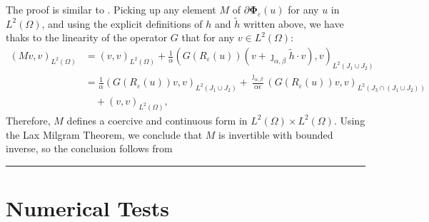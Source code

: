 \documentclass[11pt,a4paper]{amsart}
\newcommand{\kw}{\rule{2mm}{2mm}}
\newcommand{\om}{\Omega}
\renewenvironment{proof}{{Proof.}}{\hfill\kw}
\begin{document}
\begin{proof}
    The proof is similar to \cite[Theorema 4.3]{stadler2006}. Picking up any element $M$ of $\partial \mathbf{\Phi}_{\varepsilon}(u)$ for any $u$ in $L^2(\om)$, and using the explicit definitions of $h$ and $\tilde{h}$ written above, we have thaks to the linearity of the operator $G$ that for any $v\in L^2(\om)$:
    \begin{align*}
        (Mv,v)_{L^2(\om)}&=(v,v)_{L^2(\om)}+\frac{1}{\alpha}(G(R_{\varepsilon}(u))(v+\jmath_{\alpha,\beta}\tilde{h}\cdot v),v)_{L^2(J_1\cup J_2)}\\
        &= \frac{1}{\alpha}(G(R_{\varepsilon}(u))v,v)_{L^2(J_1\cup J_2)}+\frac{\jmath_{\alpha,\beta}}{\alpha\epsilon}(G(R_{\varepsilon}(u))v,v)_{L^2(J_3\cap (J_1\cup J_2))}\\
        &\quad+(v,v)_{L^2(\om)},
    \end{align*}
    Therefore, $M$ defines a coercive and continuous form in $L^2(\om)\times L^2(\om)$. Using the Lax Milgram Theorem, we conclude that $M$ is invertible with bounded inverse, so the conclusion follows from \cite[Theorem 3.13]{ulbrich2002}
\end{proof}



\section{Numerical Tests}
\end{document}
